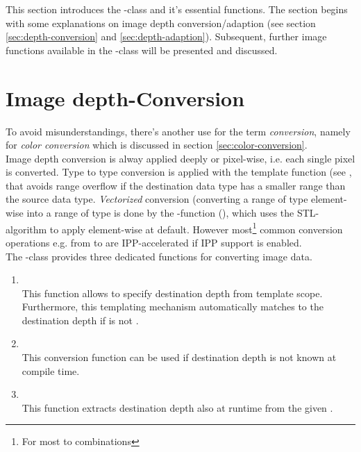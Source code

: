 This section introduces the -class and it's essential functions. The section begins with some explanations on image depth conversion/adaption (see section \ref{sec:depth-conversion} and \ref{sec:depth-adaption}). Subsequent, further image functions available in the -class will be presented and discussed. 

\section {\label{sec:depth-conversion}Image depth-Conversion}
To avoid misunderstandings, there's another use for the term \emph{conversion}, namely for \emph{color conversion} which is discussed in section \ref{sec:color-conversion}.\\
Image depth conversion is alway applied deeply or pixel-wise, i.e. each single pixel is converted. Type to type conversion is applied with the  template function (see , that avoids range overflow if the destination data type has a smaller range than the source data type. \emph{Vectorized} conversion (converting a range of type  element-wise into a range of type  is done by the -function (), which uses the STL-algorithm  to apply  element-wise at default. However most\footnote{For most  to  combinations} common conversion operations e.g. from  to  are IPP-accelerated if IPP support is enabled.\\
The -class provides three dedicated  functions for converting image data. 
\begin{enumerate}
\item {}\\
This function allows to specify destination depth from template scope. Furthermore, this templating mechanism automatically matches to the destination depth if  is not .
\item {}\\
This conversion function can be used if destination depth is not known at compile time.
\item {}\\
This function extracts destination depth also at runtime from the given .      
\end{enumerate}


